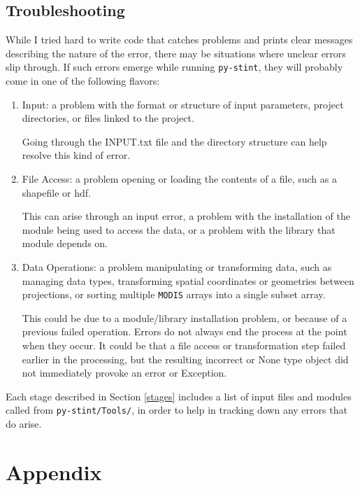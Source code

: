 \documentclass[twoside,a4paper]{refart}
\begin{document}
\subsection{Troubleshooting}
While I tried hard to write code that catches problems and prints clear messages describing the nature of the error, there may be situations where unclear errors slip through.  If such errors emerge while running \texttt{py-stint}, they will probably come in one of the following flavors:
\begin{enumerate}
  \item
    Input: a problem with the format or structure of input parameters, 
    project directories, or files linked to the project.  
    
    Going through the INPUT.txt file and the directory structure 
    can help resolve this kind of error.
  \item
    File Access: a problem opening or loading the contents of a file, 
    such as a shapefile or hdf.  
    
    This can arise through an input error, a problem with the 
    installation of the module being used to access the data,
    or a problem with the library that module depends on.
  \item
    Data Operations: a problem manipulating or transforming data, 
    such as managing data types, transforming spatial coordinates or 
    geometries between projections, or sorting multiple 
    \texttt{MODIS} arrays into a single subset array.
    
    This could be due to a module/library installation problem, or 
    because of a previous failed operation. Errors do not always end the process 
    at the point when they occur. It could be that a file access or 
    transformation step failed earlier in the processing, but the 
    resulting incorrect or None type object did not immediately provoke an 
    error or Exception.
    
\end{enumerate}

Each stage described in Section \ref{stages} includes a list of input files and modules called from \texttt{py-stint/Tools/}, in order to help in tracking down any errors that do arise.
\clearpage
\section*{Appendix}
\appendix
\end{document}
